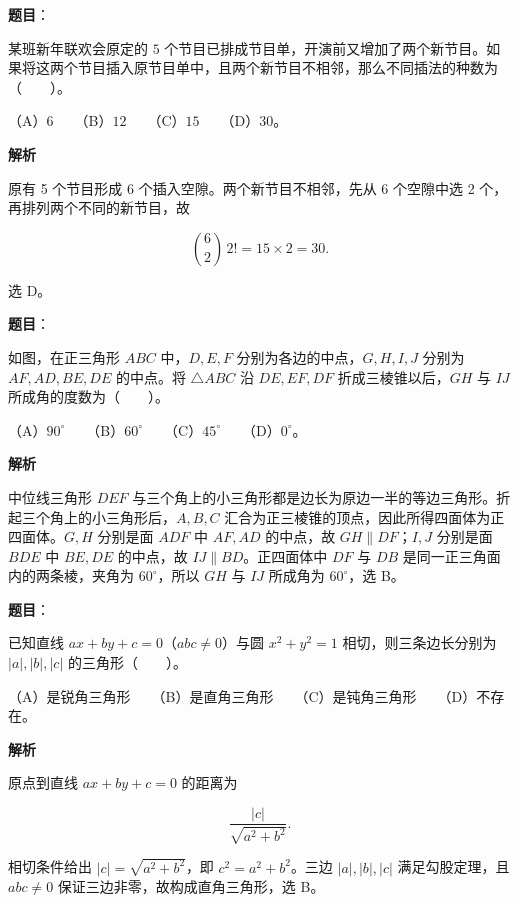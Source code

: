 \begin{answer}

\textbf{题目}：

某班新年联欢会原定的 $5$ 个节目已排成节目单，开演前又增加了两个新节目。如果将这两个节目插入原节目单中，且两个新节目不相邻，那么不同插法的种数为\mbox{（　　）}。

（A）$6$　　（B）$12$　　（C）$15$　　（D）$30$。

\textbf{解析}

原有 5 个节目形成 6 个插入空隙。两个新节目不相邻，先从 6 个空隙中选 2 个，再排列两个不同的新节目，故

\nopagebreak[4]
\[
\binom62\,2!=15\times2=30.
\]

选 D。


\end{answer}
\begin{answer}

\textbf{题目}：

如图，在正三角形 $ABC$ 中，$D,E,F$ 分别为各边的中点，$G,H,I,J$ 分别为 $AF,AD,BE,DE$ 的中点。将 $\triangle ABC$ 沿 $DE,EF,DF$ 折成三棱锥以后，$GH$ 与 $IJ$ 所成角的度数为\mbox{（　　）}。
\nopagebreak[4]
\begin{center}\end{center}
\nopagebreak[4]
（A）$90^\circ$　　（B）$60^\circ$　　（C）$45^\circ$　　（D）$0^\circ$。

\textbf{解析}

中位线三角形 $DEF$ 与三个角上的小三角形都是边长为原边一半的等边三角形。折起三个角上的小三角形后，$A,B,C$ 汇合为正三棱锥的顶点，因此所得四面体为正四面体。$G,H$ 分别是面 $ADF$ 中 $AF,AD$ 的中点，故 $GH\parallel DF$；$I,J$ 分别是面 $BDE$ 中 $BE,DE$ 的中点，故 $IJ\parallel BD$。正四面体中 $DF$ 与 $DB$ 是同一正三角面内的两条棱，夹角为 $60^\circ$，所以 $GH$ 与 $IJ$ 所成角为 $60^\circ$，选 B。


\end{answer}
\begin{answer}

\textbf{题目}：

已知直线 $ax+by+c=0$（$abc\ne0$）与圆 $x^2+y^2=1$ 相切，则三条边长分别为 $|a|,|b|,|c|$ 的三角形\mbox{（　　）}。

（A）是锐角三角形　　（B）是直角三角形　　（C）是钝角三角形　　（D）不存在。

\textbf{解析}

原点到直线 $ax+by+c=0$ 的距离为

\nopagebreak[4]
\[
\frac{|c|}{\sqrt{a^2+b^2}}.
\]

相切条件给出 $|c|=\sqrt{a^2+b^2}$，即 $c^2=a^2+b^2$。三边 $|a|,|b|,|c|$ 满足勾股定理，且 $abc\ne0$ 保证三边非零，故构成直角三角形，选 B。


\end{answer}
